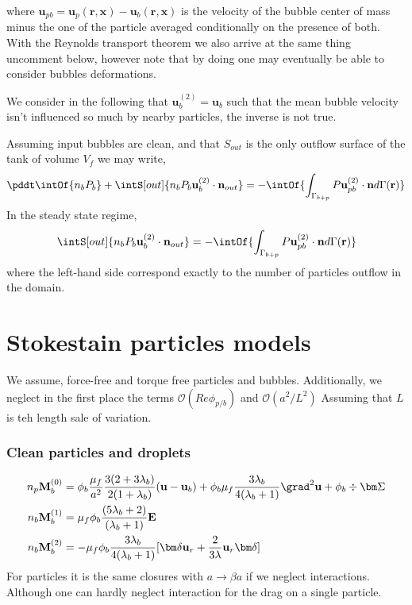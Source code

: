 where $\textbf{u}_{pb} = \textbf{u}_p(\textbf{r},\textbf{x}) - \textbf{u}_b(\textbf{r},\textbf{x})$ is the velocity of the bubble center of mass minus the one of the particle averaged conditionally on the presence of both. 
With the Reynolds transport theorem we also arrive at the same thing uncomment below, however note that by doing one may eventually be able to consider bubbles deformations. 


We consider in the following that $\textbf{u}_b^{(2)} = \textbf{u}_b$ such that the mean bubble velocity isn't influenced so much by nearby particles, the inverse is not true. 

Assuming input bubbles are clean, and that $S_{out}$ is the only outflow surface of the tank of volume $V_f$ we may write, 
\begin{equation}
    \pddt \intOf{ n_bP_b}
    + \intS[out]{ n_b P_b \textbf{u}_b^{(2)} \cdot \textbf{n}_{out}}
    =  
    - \intOf{\int_{\Gamma_{b+p}} P \textbf{u}_{pb}^{(2)}\cdot \textbf{n} d\Gamma(\textbf{r})}
\end{equation}
In  the steady state regime, 
\begin{equation}
    \intS[out]{ n_b P_b \textbf{u}_b^{(2)} \cdot \textbf{n}_{out}}
    =  
    - \intOf{\int_{\Gamma_{b+p}} P \textbf{u}_{pb}^{(2)}\cdot \textbf{n} d\Gamma(\textbf{r})}
\end{equation}
where the left-hand side correspond exactly to the number of particles outflow in the domain. 


\section{Stokestain particles models }
We assume, force-free and torque free particles and bubbles. 
Additionally, we neglect in the first place the terms $\mathcal{O}(Re \phi_{p/b})$ and $\mathcal{O}(a^2/L^2)$ Assuming that $L$ is teh length sale of variation. 

\subsubsection*{Clean particles and droplets}

\begin{align}
    n_p \textbf{M}_b^{(0)}
    &=
    \phi_b
    \frac{\mu_f}{a^2}
    \frac{3(2+3\lambda_b)}{2(1+\lambda_b)}(\textbf{u} - \textbf{u}_b)
    + \phi_b\mu_f  \frac{3\lambda_b}{4(\lambda_b +1)} \grad^2 \textbf{u}
    + \phi_b \div\bm\Sigma
    \\
    n_b \textbf{M}_b^{(1)}
    &= \mu_f \phi_b 
    \frac{(5\lambda_b +2)}{(\lambda_b +1)}\textbf{E} 
    \\
    n_b \textbf{M}_b^{(2)} 
    &=
    - \mu_f \phi_b \frac{3\lambda_b}{4(\lambda_b +1)}[\bm\delta \textbf{u}_r + \frac{2}{3\lambda}\textbf{u}_r \bm\delta ]
\end{align}
For particles it is the same closures with $a \to \beta a$ if we neglect interactions. 
Although one can hardly neglect interaction for the drag on a single particle. 

